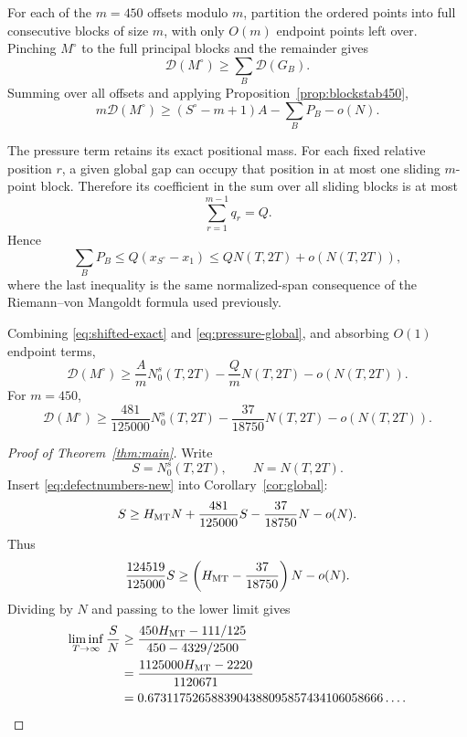 For each of the \(m=450\) offsets modulo \(m\), partition the ordered points
into full consecutive blocks of size \(m\), with only \(O(m)\) endpoint
points left over.  Pinching \(M^\circ\) to the full principal blocks and the
remainder gives
\[
 \mathcal D(M^\circ)\ge\sum_B\mathcal D(G_B).
\]
Summing over all offsets and applying Proposition~\ref{prop:blockstab450},
\begin{equation}\label{eq:shifted-exact}
 m\mathcal D(M^\circ)
 \ge
 (S^\circ-m+1)A
 -\sum_BP_B
 -o(N).
\end{equation}

The pressure term retains its exact positional mass.  For each fixed relative
position \(r\), a given global gap can occupy that position in at most one
sliding \(m\)-point block.  Therefore its coefficient in the sum over all
sliding blocks is at most
\[
 \sum_{r=1}^{m-1}q_r=Q.
\]
Hence
\begin{equation}\label{eq:pressure-global}
 \sum_BP_B
 \le
 Q(x_{S^\circ}-x_1)
 \le
 QN(T,2T)+o(N(T,2T)),
\end{equation}
where the last inequality is the same normalized-span consequence of the
Riemann--von Mangoldt formula used previously.

Combining \eqref{eq:shifted-exact} and \eqref{eq:pressure-global},
and absorbing \(O(1)\) endpoint terms,
\begin{equation}\label{eq:defectglobal-new}
 \mathcal D(M^\circ)
 \ge
 \frac{A}{m}N_0^s(T,2T)
 -\frac{Q}{m}N(T,2T)
 -o(N(T,2T)).
\end{equation}
For \(m=450\),
\begin{equation}\label{eq:defectnumbers-new}
 \mathcal D(M^\circ)
 \ge
 \frac{481}{125000}N_0^s(T,2T)
 -\frac{37}{18750}N(T,2T)
 -o(N(T,2T)).
\end{equation}


\begin{proof}[Proof of Theorem~\ref{thm:main}]
Write
\[
 S=N_0^s(T,2T),
 \qquad
 N=N(T,2T).
\]
Insert \eqref{eq:defectnumbers-new} into
Corollary~\ref{cor:global}:
\[
 S
 \ge
 H_{\rm MT}N
 +\frac{481}{125000}S
 -\frac{37}{18750}N
 -o(N).
\]
Thus
\[
 \frac{124519}{125000}S
 \ge
 \left(H_{\rm MT}-\frac{37}{18750}\right)N-o(N).
\]
Dividing by \(N\) and passing to the lower limit gives
\begin{align*}
 \liminf_{T\to\infty}\frac{S}{N}
 &\ge
 \frac{450H_{\rm MT}-111/125}
      {450-4329/2500}\\
 &=
 \frac{1125000H_{\rm MT}-2220}{1120671}\\
 &=
 0.6731175265883904388095857434106058666\ldots .
\end{align*}
\end{proof}
